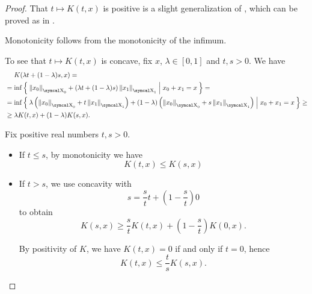 \begin{proof}
   That \( t \mapsto K(t, x) \) is positive is a slight generalization of , which can be proved as in .

  Monotonicity follows from the monotonicity of the infimum.

  To see that \( t \mapsto K(t, x) \) is concave, fix \( x \), \( \lambda \in [0, 1] \) and \( t, s > 0 \). We have
  \begin{align*}
    &\phantom{{}={}}
    K(\lambda t + (1 - \lambda) s, x)
    = \\ &=
    \inf \Set{ \Norm{x_0}_{\CX_0} + (\lambda t + (1 - \lambda) s)\Norm{x_1}_{\CX_1} | x_0 + x_1 = x }
    = \\ &=
    \inf \Set{ \lambda \left(\Norm{x_0}_{\CX_0} + t \Norm{x_1}_{\CX_1} \right) + (1 - \lambda) \left(\Norm{x_0}_{\CX_0} + s \Norm{x_1}_{\CX_1} \right) | x_0 + x_1 = x }
    \geq \\ &\geq
    \lambda K(t, x) + (1 - \lambda) K(s, x).
  \end{align*}

   Fix positive real numbers \( t, s > 0 \).
  \begin{itemize}
    \item If \( t \leq s \), by monotonicity we have
    \begin{equation}\label{eq:def:k_functional_properties/inequality/monotonicity}
      K(t, x) \leq K(s, x)
    \end{equation}

    \item If \( t > s \), we use concavity with
    \begin{equation*}
      s = \frac s t t + \left(1 - \frac s t \right) 0
    \end{equation*}
    to obtain
    \begin{equation*}
      K(s, x) \geq \frac s t K(t, x) + \left(1 - \frac s t \right) K(0, x).
    \end{equation*}

    By positivity of \( K \), we have \( K(t, x) = 0 \) if and only if \( t = 0 \), hence
    \begin{equation}\label{eq:def:k_functional_properties/inequality/concavity}
      K(t, x) \leq \frac t s K(s, x).
    \end{equation}
  \end{itemize}


\end{proof}

